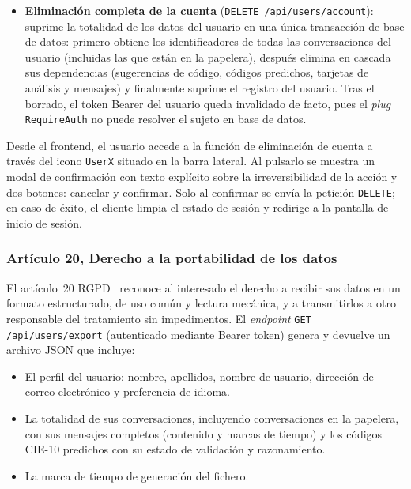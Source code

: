 \begin{itemize}
La frontera está fijada con pruebas automáticas (\texttt{App.RgpdEventStoreTest}) que fallan si alguien vuelve a añadir el texto a un evento. Sin ellas el error sería invisible: el sistema seguiría funcionando con normalidad y el informe quedaría almacenado para siempre.

 \item \textbf{Eliminación completa de la cuenta} (\texttt{DELETE /api/users/account}): suprime la totalidad de los datos del usuario en una única transacción de base de datos: primero obtiene los identificadores de todas las conversaciones del usuario (incluidas las que están en la papelera), después elimina en cascada sus dependencias (sugerencias de código, códigos predichos, tarjetas de análisis y mensajes) y finalmente suprime el registro del usuario. Tras el borrado, el token Bearer del usuario queda invalidado de facto, pues el \emph{plug} \texttt{RequireAuth} no puede resolver el sujeto en base de datos.
\end{itemize}

Desde el frontend, el usuario accede a la función de eliminación de cuenta a través del icono \texttt{UserX} situado en la barra lateral. Al pulsarlo se muestra un modal de confirmación con texto explícito sobre la irreversibilidad de la acción y dos botones: cancelar y confirmar. Solo al confirmar se envía la petición \texttt{DELETE}; en caso de éxito, el cliente limpia el estado de sesión y redirige a la pantalla de inicio de sesión.

\subsubsection{Artículo 20, Derecho a la portabilidad de los datos}

El artículo~20 RGPD~\cite{RGPD16} reconoce al interesado el derecho a recibir sus datos en un formato estructurado, de uso común y lectura mecánica, y a transmitirlos a otro responsable del tratamiento sin impedimentos. El \emph{endpoint} \texttt{GET /api/users/export} (autenticado mediante Bearer token) genera y devuelve un archivo JSON que incluye:

\begin{itemize}
 \item El perfil del usuario: nombre, apellidos, nombre de usuario, dirección de correo electrónico y preferencia de idioma.
 \item La totalidad de sus conversaciones, incluyendo conversaciones en la papelera, con sus mensajes completos (contenido y marcas de tiempo) y los códigos CIE-10 predichos con su estado de validación y razonamiento.
 \item La marca de tiempo de generación del fichero.
\end{itemize}

